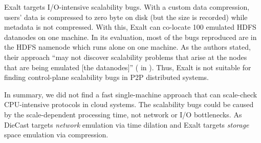Exalt \cite{Wang+14-Exalt} targets I/O-intensive scalability bugs.  With a
custom data compression, users' data is compressed to zero byte on disk (but the
size is recorded) while metadata is not compressed.  With this, Exalt can
co-locate 100 emulated HDFS datanodes on one machine.  In its evaluation, most
of the bugs reproduced are in the HDFS namenode which runs alone on one machine.
As the authors stated, their approach ``may not discover scalability problems
that arise at the nodes that are being emulated [the datanodes]'' ( in
\cite{Wang+14-Exalt}).  Thus, Exalt is not suitable for finding control-plane
scalability bugs in P2P distributed systems. 



In summary, we did not find a fast single-machine approach that can scale-check
CPU-intensive protocols in cloud systems.
%
The scalability bugs could be caused by the scale-dependent processing time, not
network or I/O bottlenecks.  As DieCast targets {\em network} emulation via time
dilation and Exalt targets {\em storage} space emulation via compression. 


